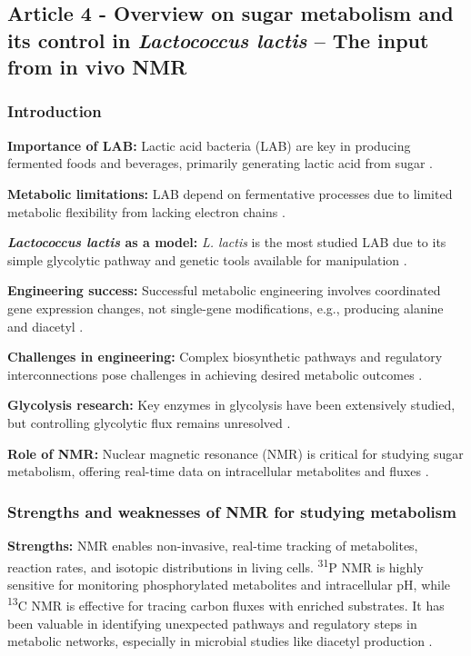 \subsection{Article 4 - Overview on sugar metabolism and its control in \textit{Lactococcus lactis} – The input from in vivo NMR}
\subsubsection*{Introduction}
\textbf{Importance of LAB:} Lactic acid bacteria (LAB) are key in producing fermented foods and beverages, primarily generating lactic acid from sugar \cite*{L3-SugarMet}.

\textbf{Metabolic limitations:} LAB depend on fermentative processes due to limited metabolic flexibility from lacking electron chains \cite*{L3-SugarMet}.

\textbf{\textit{Lactococcus lactis} as a model:} \textit{L. lactis} is the most studied LAB due to its simple glycolytic pathway and genetic tools available for manipulation \cite*{L3-SugarMet}.

\textbf{Engineering success:} Successful metabolic engineering involves coordinated gene expression changes, not single-gene modifications, e.g., producing alanine and diacetyl \cite*{L3-SugarMet}.

\textbf{Challenges in engineering:} Complex biosynthetic pathways and regulatory interconnections pose challenges in achieving desired metabolic outcomes \cite*{L3-SugarMet}.

\textbf{Glycolysis research:} Key enzymes in glycolysis have been extensively studied, but controlling glycolytic flux remains unresolved \cite*{L3-SugarMet}.

\textbf{Role of NMR:} Nuclear magnetic resonance (NMR) is critical for studying sugar metabolism, offering real-time data on intracellular metabolites and fluxes \cite*{L3-SugarMet}.
\subsubsection{Strengths and weaknesses of NMR for studying metabolism}
\textbf{Strengths:} NMR enables non-invasive, real-time tracking of metabolites, reaction rates, and isotopic distributions in living cells. \textsuperscript{31}P NMR is highly sensitive for monitoring phosphorylated metabolites and intracellular pH, while \textsuperscript{13}C NMR is effective for tracing carbon fluxes with enriched substrates. It has been valuable in identifying unexpected pathways and regulatory steps in metabolic networks, especially in microbial studies like diacetyl production \cite*{L3-SugarMet}.

